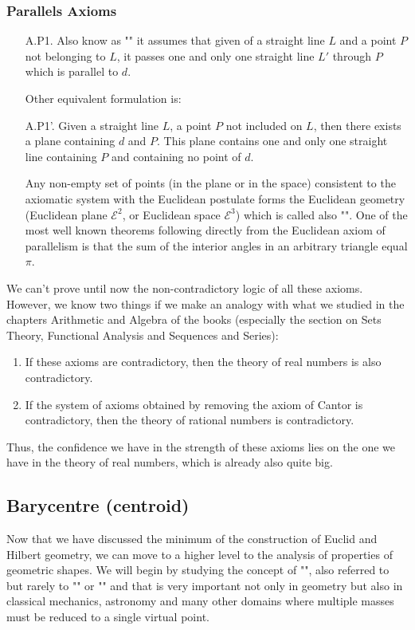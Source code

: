 	\subsubsection{Parallels Axioms}
	\begin{enumerate}
		\item[A.P1.] Also know as "" it assumes that given of a straight line $L$ and a point $P$ not belonging to $L$, it passes one and only one straight line $L'$ through $P$ which is parallel to $d$.
		
		Other equivalent formulation is:
	
		\item[A.P1'.] Given a straight line $L$, a point $P$ not included on $L$, then there exists a plane containing $d$ and $P$. This plane contains one and only one straight line containing $P$ and containing no point of $d$.
		
		Any non-empty set of points (in the plane or in the space) consistent to the axiomatic system with the Euclidean postulate forms the Euclidean geometry (Euclidean plane $\mathcal{E}^2$, or Euclidean space $\mathcal{E}^3$) which is called also "". One of the most well known theorems following directly from the Euclidean axiom of parallelism is that the sum of the interior angles in an arbitrary triangle equal $\pi$.
	\end{enumerate}
	
	We can't prove until now the non-contradictory logic of all these axioms. However, we know two things if we make an analogy with what we studied in the chapters Arithmetic and Algebra of the books (especially the section on Sets Theory, Functional Analysis and Sequences and Series):
   \begin{enumerate}
      \item If these axioms are contradictory, then the theory of real numbers is also contradictory.

      \item If the system of axioms obtained by removing the axiom of Cantor is contradictory, then the theory of rational numbers is contradictory.
   \end{enumerate}
   Thus, the confidence we have in the strength of these axioms lies on the one we have in the theory of real numbers, which is already also quite big.
   
   \pagebreak
   \subsection{Barycentre (centroid)}\label{barycenter}
   Now that we have discussed the minimum of the construction of Euclid and Hilbert geometry, we can move to a higher level to the analysis of properties of geometric shapes. We will begin by studying the concept of "", also referred to but rarely to "" or "" and that is very important not only in geometry but also in classical mechanics, astronomy and many other domains where multiple masses must be reduced to a single virtual point.
   
